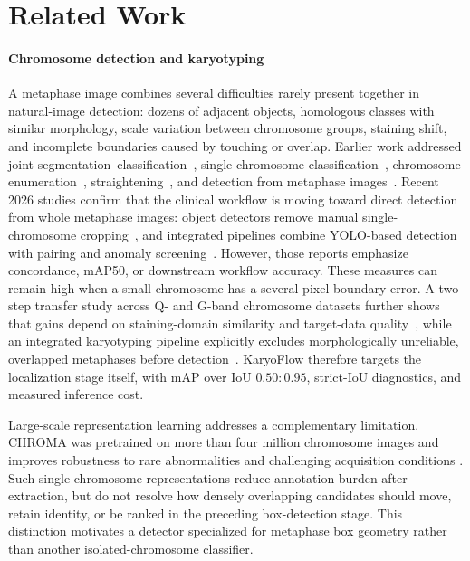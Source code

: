 \documentclass[journal,10pt]{IEEEtran}
\theoremstyle{definition}
\begin{document}
\section{Related Work}\label{sec:related}


\paragraph{Chromosome detection and karyotyping}
A metaphase image combines several difficulties rarely present together in
natural-image detection: dozens of adjacent objects, homologous classes with
similar morphology, scale variation between chromosome groups, staining
shift, and incomplete boundaries caused by touching or overlap. Earlier work
addressed joint segmentation--classification~\cite{schwartzkopf2005mfish},
single-chromosome classification~\cite{qin2019varifocalchromosome}, chromosome
enumeration~\cite{xiao2020deepacev2}, straightening~\cite{li2024mcvae}, and
detection from metaphase images~\cite{kuo2024chromosomenet}. Recent 2026 studies
confirm that the clinical workflow is moving toward direct detection from
whole metaphase images: object detectors remove manual single-chromosome
cropping~\cite{matsumoto2026scc}, and integrated pipelines combine YOLO-based
detection with pairing and anomaly screening~\cite{rosas2026karyotyping}.
However, those reports emphasize concordance, mAP50, or downstream workflow
accuracy. These measures can remain high when a small chromosome has a
several-pixel boundary error. A two-step transfer study across Q- and G-band
chromosome datasets further shows that gains depend on staining-domain
similarity and target-data quality~\cite{chen2026transfer}, while an integrated
karyotyping pipeline explicitly excludes morphologically unreliable,
overlapped metaphases before detection~\cite{rosas2026karyotyping}. KaryoFlow therefore targets the
localization stage itself, with mAP over IoU $0.50{:}0.95$, strict-IoU
diagnostics, and measured inference cost.

Large-scale representation learning addresses a complementary limitation.
CHROMA was pretrained on more than four million chromosome images and improves
robustness to rare abnormalities and challenging acquisition conditions
\cite{yang2026chroma}. Such single-chromosome representations reduce annotation
burden after extraction, but do not resolve how densely overlapping candidates
should move, retain identity, or be ranked in the preceding box-detection
stage. This distinction motivates a detector specialized for metaphase box
geometry rather than another isolated-chromosome classifier.
\end{document}
